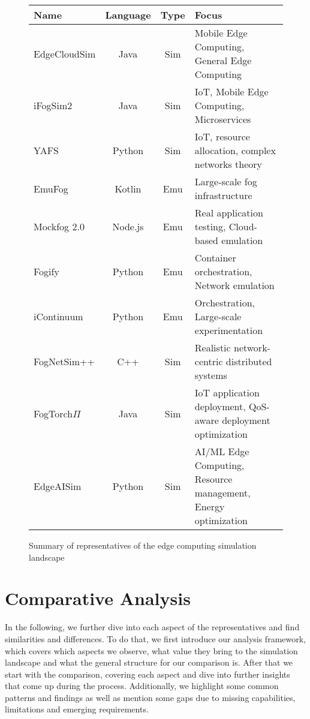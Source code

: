 \begin{figure}[H]
  \centering
  \begin{tabularx}{\textwidth}{l | c | c | X }
    \hline
    \textbf{Name} & \textbf{Language} & \textbf{Type} & \textbf{Focus} \\\hline
    EdgeCloudSim  & Java & Sim & Mobile Edge Computing, General Edge Computing\\\hline
    iFogSim2      & Java & Sim & IoT, Mobile Edge Computing, Microservices\\\hline
    YAFS          & Python & Sim & IoT, resource allocation, complex networks theory\\\hline
    EmuFog        & Kotlin & Emu & Large-scale fog infrastructure\\\hline
    Mockfog 2.0   & Node.js & Emu & Real application testing, Cloud-based emulation\\\hline
    Fogify        & Python & Emu & Container orchestration, Network emulation\\\hline
    iContinuum    & Python & Emu & Orchestration, Large-scale experimentation\\\hline
    FogNetSim++   & C++ & Sim & Realistic network-centric distributed systems\\\hline
    FogTorch$\Pi$ & Java & Sim & IoT application deployment, QoS-aware deployment optimization\\\hline
    EdgeAISim     & Python & Sim & AI/ML Edge Computing, Resource management, Energy optimization\\\hline
  \end{tabularx}
  \caption{Summary of representatives of the edge computing simulation landscape}
  \label{tab:overview-table-representatives}
\end{figure}

\section{Comparative Analysis}
In the following, we further dive into each aspect of the representatives and find similarities and differences.
To do that, we first introduce our analysis framework, which covers which aspects we observe, what value they bring to the simulation landscape and what the general structure for our comparison is.
After that we start with the comparison, covering each aspect and dive into further insights that come up during the process.
Additionally, we highlight some common patterns and findings as well as mention some gaps due to missing capabilities, limitations and emerging requirements.


